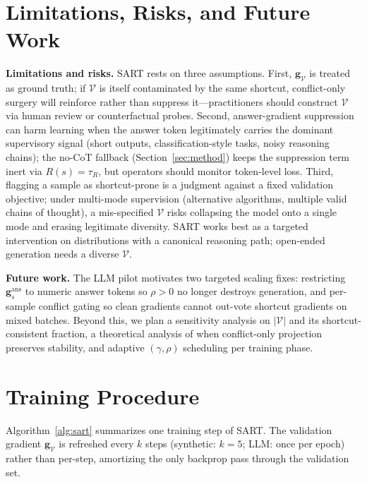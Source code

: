 \clearpage
\appendix

\section{Limitations, Risks, and Future Work}
\label{sec:appendix_limitations}

\textbf{Limitations and risks.} SART rests on three assumptions. First, $\mathbf{g}_{\mathcal{V}}$ is treated as ground truth; if $\mathcal{V}$ is itself contaminated by the same shortcut, conflict-only surgery will reinforce rather than suppress it---practitioners should construct $\mathcal{V}$ via human review or counterfactual probes. Second, answer-gradient suppression can harm learning when the answer token legitimately carries the dominant supervisory signal (short outputs, classification-style tasks, noisy reasoning chains); the no-CoT fallback (Section~\ref{sec:method}) keeps the suppression term inert via $R(s)=\tau_R$, but operators should monitor token-level loss. Third, flagging a sample as shortcut-prone is a judgment against a fixed validation objective; under multi-mode supervision (alternative algorithms, multiple valid chains of thought), a mis-specified $\mathcal{V}$ risks collapsing the model onto a single mode and erasing legitimate diversity. SART works best as a targeted intervention on distributions with a canonical reasoning path; open-ended generation needs a diverse $\mathcal{V}$.

\textbf{Future work.} The LLM pilot motivates two targeted scaling fixes: restricting $\mathbf{g}_s^{\mathrm{ans}}$ to numeric answer tokens so $\rho>0$ no longer destroys generation, and per-sample conflict gating so clean gradients cannot out-vote shortcut gradients on mixed batches. Beyond this, we plan a sensitivity analysis on $|\mathcal{V}|$ and its shortcut-consistent fraction, a theoretical analysis of when conflict-only projection preserves stability, and adaptive $(\gamma, \rho)$ scheduling per training phase.

\section{Training Procedure}
\label{sec:appendix_algorithm}

Algorithm~\ref{alg:sart} summarizes one training step of SART. The validation gradient $\mathbf{g}_{\mathcal{V}}$ is refreshed every $k$ steps (synthetic: $k{=}5$; LLM: once per epoch) rather than per-step, amortizing the only backprop pass through the validation set.

